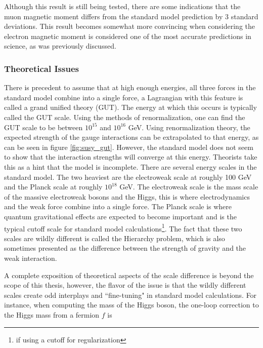 \begin{enumerate}
       Although this result is still being tested, there are some indications that the muon magnetic moment differs from the standard model prediction by 3 standard deviations.\cite{mu_g-2} This result becomes somewhat more convincing when considering the electron magnetic moment is considered one of the most accurate predictions in science, as was previously discussed.
    \end{enumerate}

  \subsubsection{Theoretical Issues} \label{sec:theoretical_issues_with_sm}
    \begin{enumerate}
       There is precedent to assume that at high enough energies, all three forces in the standard model combine into a single force, a Lagrangian with this feature is called a grand unified theory (GUT). The energy at which this occurs is typically called the GUT scale. Using the methods of renormalization, one can find the GUT scale to be between $10^{15}$ and $10^{16}$ GeV. Using renormalization theory, the expected strength of the gauge interactions can be extrapolated to that energy, as can be seen in figure \ref{fig:susy_gut}. However, the standard model does not seem to show that the interaction strengths will converge at this energy. Theorists take this as a hint that the model is incomplete.
       There are several energy scales in the standard model. The two heaviest are the electroweak scale at roughly 100 GeV and the Planck scale at roughly $10^{18}$ GeV. The electroweak scale is the mass scale of the massive electroweak bosons and the Higgs, this is where electrodynamics and the weak force combine into a single force. The Planck scale is where quantum gravitational effects are expected to become important and is the typical cutoff scale for standard model calculations\footnote{if using a cutoff for regularization}. The fact that these two scales are wildly different is called the Hierarchy problem, which is also sometimes presented as the difference between the strength of gravity and the weak interaction.

      A complete exposition of theoretical aspects of the scale difference is beyond the scope of this thesis, however, the flavor of the issue is that the wildly different scales create odd interplays and ``fine-tuning" in standard model calculations. For instance, when computing the mass of the Higgs boson, the one-loop correction to the Higgs mass from a fermion $f$ is


\end{enumerate}
